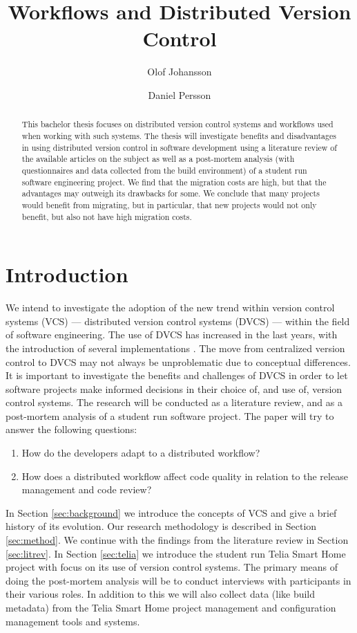 \documentclass{llncs}
\title{Workflows and Distributed Version Control}
\author{Olof Johansson \inst{1} \and Daniel Persson\inst{1}}
\institute{
	Blekinge Institute of Technology \\
	\email{olof@ethup.se}, \email{daniel@silvertejp.org}
}
\begin{document}
\maketitle

\begin{abstract}
 This bachelor thesis focuses on distributed version control systems
 and workflows used when working with such systems. The thesis will
 investigate benefits and disadvantages in using distributed version
 control in software development using a literature review of the
 available articles on the subject as well as a post-mortem analysis
 (with questionnaires and data collected from the build environment) 
 of a student run software engineering project. We find that the
 migration costs are high, but that the advantages may outweigh its
 drawbacks for some. We conclude that many projects would benefit from
 migrating, but in particular, that new projects would not only
 benefit, but also not have high migration costs.
\end{abstract}

\section{Introduction}

We intend to investigate the adoption of the new trend within version
control systems (VCS) --- distributed version control systems (DVCS)
--- within the field of software engineering. The use of DVCS has
increased in the last years, with the introduction of several
implementations \cite{bird09}. The move from centralized version
control to DVCS may not always be unproblematic due to conceptual
differences. It is important to investigate the benefits and
challenges of DVCS in order to let software projects make informed
decisions in their choice of, and use of, version control systems. The
research will be conducted as a literature review, and as a
post-mortem analysis of a student run software project. The paper will
try to answer the following questions:

\begin{enumerate}
 \item How do the developers adapt to a distributed workflow?
 \item How does a distributed workflow affect code quality in relation
       to the release management and code review?
\end{enumerate}

In Section \ref{sec:background} we introduce the concepts of VCS and
give a brief history of its evolution. Our research methodology is
described in Section \ref{sec:method}. We continue with the findings
from the literature review in Section \ref{sec:litrev}. In Section
\ref{sec:telia} we introduce the student run Telia Smart Home project
with focus on its use of version control systems. The primary means of
doing the post-mortem analysis will be to conduct interviews with
participants in their various roles. In addition to this we will also
collect data (like build metadata) from the Telia Smart Home project
management and configuration management tools and systems.
\end{document}
